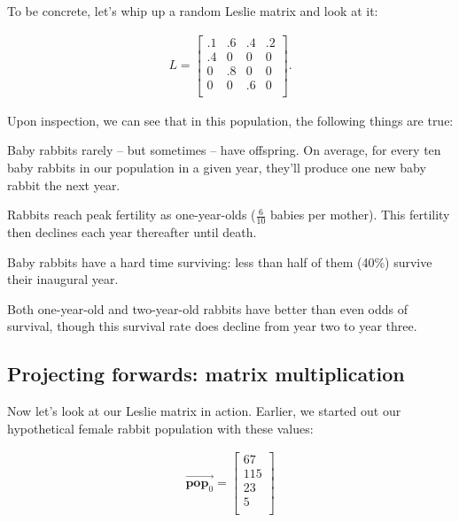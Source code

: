 To be concrete, let's whip up a random Leslie matrix and look at it:

\vspace{-.15in}
\begin{align*}
L =
\begin{bmatrix}
.1 & .6 & .4 & .2 \\
.4 & 0 & 0 & 0 \\
0 & .8 & 0 & 0 \\
0 & 0 & .6 & 0 \\
\end{bmatrix}.
\end{align*}
\vspace{-.15in}

Upon inspection, we can see that in this population, the following things are
true:

\begin{compactitem}
\item Baby rabbits rarely -- but sometimes -- have offspring. On average, for
every ten baby rabbits in our population in a given year, they'll produce one
new baby rabbit the next year.
\item Rabbits reach peak fertility as one-year-olds ($\frac{6}{10}$ babies per
mother). This fertility then declines each year thereafter until death.
\item Baby rabbits have a hard time surviving: less than half of them (40\%)
survive their inaugural year.
\item Both one-year-old and two-year-old rabbits have better than even odds of
survival, though this survival rate does decline from year two to year three.
\end{compactitem}


\subsection{Projecting forwards: matrix multiplication}

Now let's look at our Leslie matrix in action. Earlier, we started out our
hypothetical female rabbit population with these values:

\vspace{-.15in}
\begin{align*}
\overrightarrow{\textbf{pop}_0} =
\begin{bmatrix}
67 \\ 115 \\ 23 \\ 5 \\
\end{bmatrix}
\end{align*}
\vspace{-.15in}


